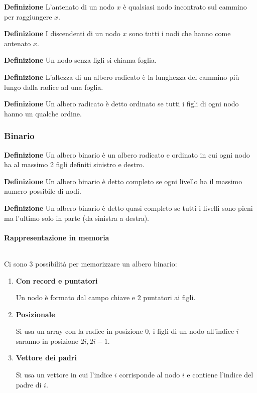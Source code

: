 \documentclass{article}
\begin{document}
\noindent\textbf{Definizione} L'antenato di un nodo $x$ è qualsiasi nodo incontrato sul cammino per raggiungere $x$.\newline

\noindent\textbf{Definizione} I discendenti di un nodo $x$ sono tutti i nodi che hanno come antenato $x$.\newline

\noindent\textbf{Definizione} Un nodo senza figli si chiama foglia.\newline

\noindent\textbf{Definizione} L'altezza di un albero radicato è la lunghezza del cammino più lungo dalla radice ad una foglia.\newline

\noindent\textbf{Definizione} Un albero radicato è detto ordinato se tutti i figli di ogni nodo hanno un qualche ordine.\newline

\newpage

\subsubsection{Binario}

\noindent\textbf{Definizione} Un albero binario è un albero radicato e ordinato in cui ogni nodo ha al massimo 2 figli definiti sinistro e destro.\newline

\noindent\textbf{Definizione} Un albero binario è detto completo se ogni livello ha il massimo numero possibile di nodi.\newline

\noindent\textbf{Definizione} Un albero binario è detto quasi completo se tutti i livelli sono pieni ma l'ultimo solo in parte (da sinistra a destra).\newline

\paragraph{Rappresentazione in memoria} $\ $\newline

\noindent Ci sono 3 possibilità per memorizzare un albero binario:
\begin{enumerate}
    \item \textbf{Con record e puntatori}

    Un nodo è formato dal campo chiave e 2 puntatori ai figli.

    \item \textbf{Posizionale} 

    Si usa un array con la radice in posizione 0, i figli di un nodo all'indice $i$ saranno in posizione $2i,2i-1$.

    \item \textbf{Vettore dei padri}

    Si usa un vettore in cui l'indice $i$ corrisponde al nodo $i$ e contiene l'indice del padre di $i$.
    
\end{enumerate}
\end{document}
